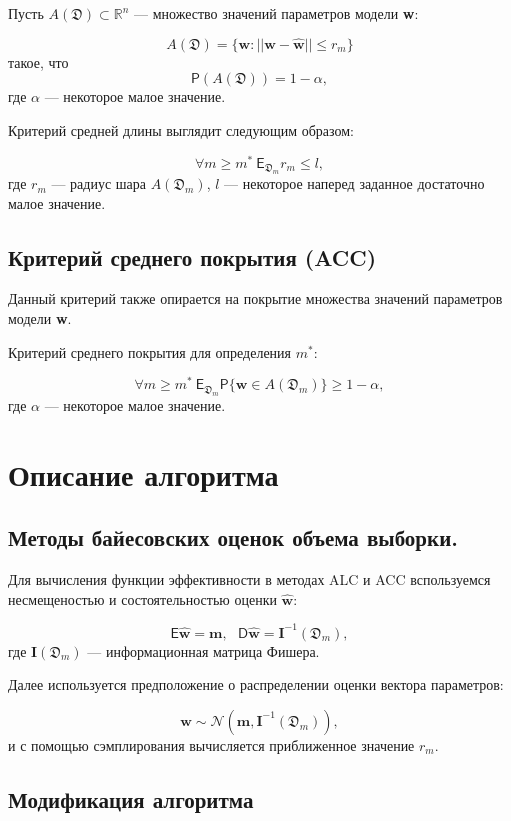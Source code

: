 \documentclass[12pt,twoside]{article}
\begin{document}
Пусть $A(\mathfrak{D}) \subset \mathbb{R}^n$ --- множество значений параметров модели \textbf{w}:

$$
A(\mathfrak{D}) = \{\textbf{w} : ||\textbf{w}- \hat{\textbf{w}}|| \leqslant r_m\}
$$
такое, что
$$
\mathsf{P}(A(\mathfrak{D})) = 1 - \alpha,
$$
где $\alpha$ --- некоторое малое значение. 

Критерий средней длины выглядит следующим образом:

$$
\forall m \geqslant  m^{*}~\mathsf{E}_{\mathfrak D_m} r_m \leqslant l , 
$$
где $r_m$ --- радиус шара $A(\mathfrak{D}_m)$, $l$ --- некоторое наперед заданное достаточно малое значение.

\subsection{Критерий среднего покрытия (ACC)}

Данный критерий также опирается на покрытие множества значений параметров модели \textbf{w}.

Критерий среднего покрытия для определения $m^{*}$:

$$
\forall m \geqslant m^{*}~\mathsf{E}_{\mathfrak D_m} \mathsf{P}\{\textbf{w} \in A(\mathfrak D_m)\} \geqslant 1 - \alpha,
$$
где $\alpha$ --- некоторое малое значение.

\section{Описание алгоритма}

\subsection{Методы байесовских оценок объема выборки.}  Для вычисления функции эффективности в методах ALC и ACC  вспользуемся несмещеностью и состоятельностью оценки $\hat{\textbf{w}}$:

$$
\mathsf{E}\hat{\textbf{w}} = \textbf{m}, ~~~\mathsf{D}\hat{\textbf{w}} = \textbf{I}^{-1}(\mathfrak D_m),
$$
где $\textbf{I}(\mathfrak D_m)$ --- информационная матрица Фишера.

Далее используется предположение о распределении оценки вектора параметров:

$$
\hat{\textbf{w}} \sim \mathcal{N}(\textbf{m},  \textbf{I}^{-1}(\mathfrak D_m)),
$$
и с помощью сэмплирования вычисляется приближенное значение $r_m$.

\subsection{Модификация алгоритма}
\end{document}
